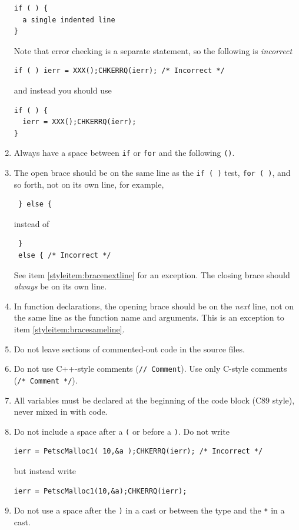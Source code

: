 \begin{enumerate}
\begin{lstlisting}
if ( ) {
  a single indented line
}
\end{lstlisting}
Note that error checking is a separate statement, so the following is {\em incorrect}
\begin{lstlisting}
if ( ) ierr = XXX();CHKERRQ(ierr); /* Incorrect */
\end{lstlisting}
and instead you should use
\begin{lstlisting}
if ( ) {
  ierr = XXX();CHKERRQ(ierr);
}
\end{lstlisting}
\item Always have a space between \lstinline{if} or \lstinline{for} and the following \lstinline{()}.
\item \label{styleitem:bracesameline} The open brace should be on the same line as the \lstinline{if ( )} test, \lstinline{for ( )}, and so forth, not on its own line, for example,
\begin{lstlisting}
 } else {
\end{lstlisting}
instead of
\begin{lstlisting}
 }
 else { /* Incorrect */
\end{lstlisting}
See item \ref{styleitem:bracenextline} for an exception.
 The closing brace should {\em always} be on its own line.
\item \label{styleitem:bracenextline} In function declarations, the opening brace should be on the {\em next} line, not on the same line as the function name and arguments.
  This is an exception to item \ref{styleitem:bracesameline}.
\item Do not leave sections of commented-out code in the source files.
\item Do not use C++-style comments (\lstinline{// Comment}). Use only C-style comments (\lstinline{/* Comment */}).
\item All variables must be declared at the beginning of the code block (C89 style), never mixed in with code.
\item Do not include a space after a \lstinline{(} or before a \lstinline{)}. Do not write
\begin{lstlisting}
ierr = PetscMalloc1( 10,&a );CHKERRQ(ierr); /* Incorrect */
\end{lstlisting}
but instead write
\begin{lstlisting}
ierr = PetscMalloc1(10,&a);CHKERRQ(ierr);
\end{lstlisting}
\item Do not use a space after the \lstinline{)} in a cast or between the type and the \lstinline{*} in a cast.

\end{enumerate}
